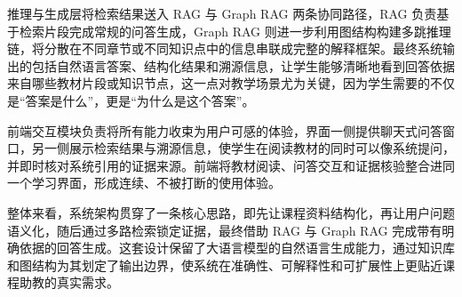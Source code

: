 推理与生成层将检索结果送入 RAG 与 Graph RAG 两条协同路径，RAG 负责基于检索片段完成常规的问答生成，Graph RAG 则进一步利用图结构构建多跳推理链，将分散在不同章节或不同知识点中的信息串联成完整的解释框架。最终系统输出的包括自然语言答案、结构化结果和溯源信息，让学生能够清晰地看到回答依据来自哪些教材片段或知识节点，这一点对教学场景尤为关键，因为学生需要的不仅是“答案是什么”，更是“为什么是这个答案”。

前端交互模块负责将所有能力收束为用户可感的体验，界面一侧提供聊天式问答窗口，另一侧展示检索结果与溯源信息，使学生在阅读教材的同时可以像系统提问，并即时核对系统引用的证据来源。前端将教材阅读、问答交互和证据核验整合进同一个学习界面，形成连续、不被打断的使用体验。

整体来看，系统架构贯穿了一条核心思路，即先让课程资料结构化，再让用户问题语义化，随后通过多路检索锁定证据，最终借助 RAG 与 Graph RAG 完成带有明确依据的回答生成。这套设计保留了大语言模型的自然语言生成能力，通过知识库和图结构为其划定了输出边界，使系统在准确性、可解释性和可扩展性上更贴近课程助教的真实需求。


